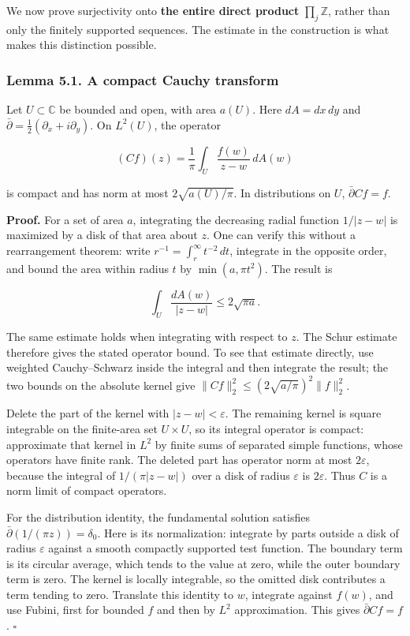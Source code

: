 \documentclass[
  11pt,
]{article}
\begin{document}
We now prove surjectivity onto \textbf{the entire direct product}
\(\prod_j\mathbb Z\), rather than only the finitely supported sequences.
The estimate in the construction is what makes this distinction
possible.

\subsubsection{Lemma 5.1. A compact Cauchy
transform}\label{lemma-5.1.-a-compact-cauchy-transform}

Let \(U\subset\mathbb C\) be bounded and open, with area \(a(U)\). Here
\(dA=dx\,dy\) and \(\bar\partial=\tfrac12(\partial_x+i\partial_y)\). On
\(L^2(U)\), the operator

\[
(Cf)(z)=\frac1\pi\int_U\frac{f(w)}{z-w}\,dA(w)
\]

is compact and has norm at most \(2\sqrt{a(U)/\pi}\). In distributions
on \(U\), \(\bar\partial Cf=f\).

\textbf{Proof.} For a set of area \(a\), integrating the decreasing
radial function \(1/|z-w|\) is maximized by a disk of that area about
\(z\). One can verify this without a rearrangement theorem: write
\(r^{-1}=\int_r^\infty t^{-2}\,dt\), integrate in the opposite order,
and bound the area within radius \(t\) by \(\min(a,\pi t^2)\). The
result is

\[
\int_U\frac{dA(w)}{|z-w|}\leq2\sqrt{\pi a}.
\]

The same estimate holds when integrating with respect to \(z\). The
Schur estimate therefore gives the stated operator bound. To see that
estimate directly, use weighted Cauchy--Schwarz inside the integral and
then integrate the result; the two bounds on the absolute kernel give
\(\|Cf\|_2^2\leq(2\sqrt{a/\pi})^2\|f\|_2^2\).

Delete the part of the kernel with \(|z-w|<\varepsilon\). The remaining
kernel is square integrable on the finite-area set \(U\times U\), so its
integral operator is compact: approximate that kernel in \(L^2\) by
finite sums of separated simple functions, whose operators have finite
rank. The deleted part has operator norm at most \(2\varepsilon\),
because the integral of \(1/(\pi|z-w|)\) over a disk of radius
\(\varepsilon\) is \(2\varepsilon\). Thus \(C\) is a norm limit of
compact operators.

For the distribution identity, the fundamental solution satisfies
\(\bar\partial(1/(\pi z))=\delta_0\). Here is its normalization:
integrate by parts outside a disk of radius \(\varepsilon\) against a
smooth compactly supported test function. The boundary term is its
circular average, which tends to the value at zero, while the outer
boundary term is zero. The kernel is locally integrable, so the omitted
disk contributes a term tending to zero. Translate this identity to
\(w\), integrate against \(f(w)\), and use Fubini, first for bounded
\(f\) and then by \(L^2\) approximation. This gives
\(\bar\partial Cf=f\). \(\square\)
\end{document}
